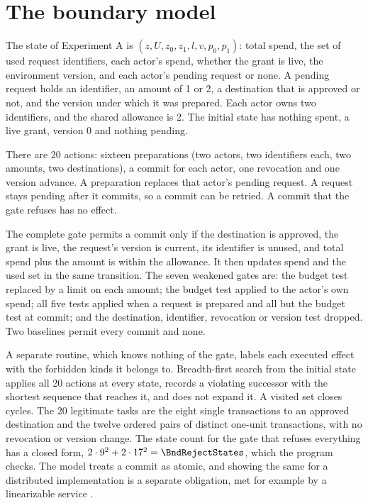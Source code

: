 \documentclass[10pt,twocolumn]{article}
\theoremstyle{plain}
\theoremstyle{definition}
\begin{document}
\section{The boundary model}\label{app:model}

The state of Experiment A is $(z,U,z_{0},z_{1},l,v,p_{0},p_{1})$: total spend, the set of
used request identifiers, each actor's spend, whether the grant is live, the environment
version, and each actor's pending request or none. A pending request holds an identifier, an
amount of 1 or 2, a destination that is approved or not, and the version under which it was
prepared. Each actor owns two identifiers, and the shared allowance is 2. The initial state
has nothing spent, a live grant, version 0 and nothing pending.

There are 20 actions: sixteen preparations (two actors, two identifiers each, two amounts,
two destinations), a commit for each actor, one revocation and one version advance. A
preparation replaces that actor's pending request. A request stays pending after it commits,
so a commit can be retried. A commit that the gate refuses has no effect.

The complete gate permits a commit only if the destination is approved, the grant is live,
the request's version is current, its identifier is unused, and total spend plus the amount
is within the allowance. It then updates spend and the used set in the same transition. The
seven weakened gates are: the budget test replaced by a limit on each amount; the budget test
applied to the actor's own spend; all five tests applied when a request is prepared and all
but the budget test at commit; and the destination, identifier, revocation or version test
dropped. Two
baselines permit every commit and none.

A separate routine, which knows nothing of the gate, labels each executed effect with the
forbidden kinds it belongs to. Breadth-first search from the initial state applies all 20
actions at every state, records a violating successor with the shortest sequence that
reaches it, and does not expand it. A visited set closes cycles. The 20 legitimate tasks are
the eight single transactions to an approved destination and the twelve ordered pairs of
distinct one-unit transactions, with no revocation or version change. The state count for
the gate that refuses everything has a closed form, $2\cdot 9^{2}+2\cdot 17^{2}=\BndRejectStates$,
which the program checks. The model treats a commit as atomic, and showing the same for a distributed
implementation is a separate obligation, met for example by a linearizable service
\cite{herlihy1990}.
\end{document}
